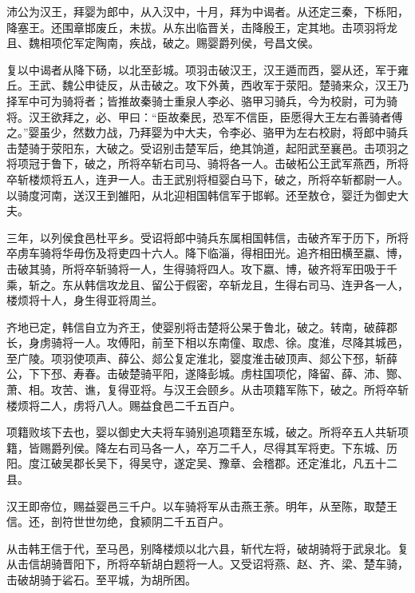 \documentclass[12pt,UTF8]{ctexbook}
\begin{document}
沛公为汉王，拜婴为郎中，从入汉中，十月，拜为中谒者。从还定三秦，下栎阳，降塞王。还围章邯废丘，未拔。从东出临晋关，击降殷王，定其地。击项羽将龙且、魏相项佗军定陶南，疾战，破之。赐婴爵列侯，号昌文侯。



复以中谒者从降下砀，以北至彭城。项羽击破汉王，汉王遁而西，婴从还，军于雍丘。王武、魏公申徒反，从击破之。攻下外黄，西收军于荥阳。楚骑来众，汉王乃择军中可为骑将者；皆推故秦骑士重泉人李必、骆甲习骑兵，今为校尉，可为骑将。汉王欲拜之，必、甲曰：“臣故秦民，恐军不信臣，臣愿得大王左右善骑者傅之。”婴虽少，然数力战，乃拜婴为中大夫，令李必、骆甲为左右校尉，将郎中骑兵击楚骑于荥阳东，大破之。受诏别击楚军后，绝其饷道，起阳武至襄邑。击项羽之将项冠于鲁下，破之，所将卒斩右司马、骑将各一人。击破柘公王武军燕西，所将卒斩楼烦将五人，连尹一人。击王武别将桓婴白马下，破之，所将卒斩都尉一人。以骑度河南，送汉王到雒阳，从北迎相国韩信军于邯郸。还至敖仓，婴迁为御史大夫。



三年，以列侯食邑杜平乡。受诏将郎中骑兵东属相国韩信，击破齐军于历下，所将卒虏车骑将华毋伤及将吏四十六人。降下临淄，得相田光。追齐相田横至嬴、博，击破其骑，所将卒斩骑将一人，生得骑将四人。攻下嬴、博，破齐将军田吸于千乘，斩之。东从韩信攻龙且、留公于假密，卒斩龙且，生得右司马、连尹各一人，楼烦将十人，身生得亚将周兰。



齐地已定，韩信自立为齐王，使婴别将击楚将公杲于鲁北，破之。转南，破薛郡长，身虏骑将一人。攻傅阳，前至下相以东南僮、取虑、徐。度淮，尽降其城邑，至广陵。项羽使项声、薛公、郯公复定淮北，婴度淮击破顶声、郯公下邳，斩薛公，下下邳、寿春。击破楚骑平阳，遂降彭城。虏柱国项佗，降留、薛、沛、酂、萧、相。攻苦、谯，复得亚将。与汉王会颐乡。从击项籍军陈下，破之。所将卒斩楼烦将二人，虏将八人。赐益食邑二千五百户。



项籍败垓下去也，婴以御史大夫将车骑别追项籍至东城，破之。所将卒五人共斩项籍，皆赐爵列侯。降左右司马各一人，卒万二千人，尽得其军将吏。下东城、历阳。度江破吴郡长吴下，得吴守，遂定吴、豫章、会稽郡。还定淮北，凡五十二县。



汉王即帝位，赐益婴邑三千户。以车骑将军从击燕王荼。明年，从至陈，取楚王信。还，剖符世世勿绝，食颍阴二千五百户。



从击韩王信于代，至马邑，别降楼烦以北六县，斩代左将，破胡骑将于武泉北。复从击信胡骑晋阳下，所将卒斩胡白题将一人。又受诏将燕、赵、齐、梁、楚车骑，击破胡骑于硰石。至平城，为胡所困。
\end{document}
